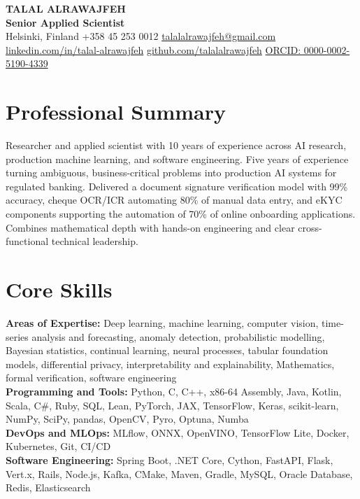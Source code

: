 \documentclass[10pt,a4paper]{article}
\begin{document}
\RaggedRight

\begin{center}
  {\LARGE\bfseries TALAL ALRAWAJFEH}\\[2pt]
  {\normalsize\bfseries Senior Applied Scientist}\\[4pt]
  Helsinki, Finland \textbar{} +358 45 253 0012 \textbar{}
  \href{mailto:talalalrawajfeh@gmail.com}{talalalrawajfeh@gmail.com}\\[2pt]
  \href{https://www.linkedin.com/in/talal-alrawajfeh}{linkedin.com/in/talal-alrawajfeh} \textbar{}
  \href{https://github.com/talalalrawajfeh}{github.com/talalalrawajfeh} \textbar{}
  \href{https://orcid.org/0000-0002-5190-4339}{ORCID: 0000-0002-5190-4339}
\end{center}
\vspace{-5pt}

\section{Professional Summary}
Researcher and applied scientist with 10 years of experience across AI research, production machine learning, and software engineering.
Five years of experience turning ambiguous, business-critical problems into production AI systems for regulated banking.
Delivered a document signature verification model with 99\% accuracy, cheque OCR/ICR automating 80\% of manual data entry, and eKYC components supporting the automation of 70\% of online onboarding applications. 
Combines mathematical depth with hands-on engineering and clear cross-functional technical leadership.

\section{Core Skills}
\textbf{Areas of Expertise:} Deep learning, machine learning, computer vision, time-series analysis and forecasting, anomaly detection, probabilistic modelling, Bayesian statistics, continual learning, neural processes, tabular foundation models, differential privacy, interpretability and explainability, Mathematics, formal verification, software engineering \\
\textbf{Programming and Tools:} Python, C, C++, x86-64 Assembly, Java, Kotlin, Scala, C\#, Ruby, SQL, Lean, PyTorch, JAX, TensorFlow, Keras, scikit-learn, NumPy, SciPy, pandas, OpenCV, Pyro, Optuna, Numba\\
\textbf{DevOps and MLOps:} MLflow, ONNX, OpenVINO, TensorFlow Lite, Docker, Kubernetes, Git, CI/CD \\
\textbf{Software Engineering:} Spring Boot, .NET Core, Cython, FastAPI, Flask, Vert.x, Rails, Node.js, Kafka, CMake, Maven, Gradle, MySQL, Oracle Database, Redis, Elasticsearch
\end{document}
